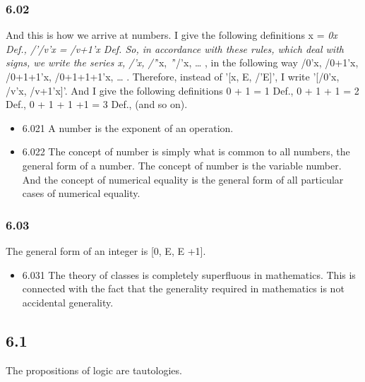 \documentclass[11pt]{article}
\begin{document}
\subsubsection*{6.02}
\label{sec:org99169f6}
And this is how we arrive at numbers. I give the following definitions
x = \emph{0x Def., /'/v'x = /v+1'x Def. So, in accordance with these rules,
which deal with signs, we write the series x, /'x, /'}'x, \emph{'}'/'x, \ldots{} , in
the following way /0'x, /0+1'x, /0+1+1'x, /0+1+1+1'x, \ldots{} . Therefore,
instead of '[x, E, /'E]', I write '[/0'x, /v'x, /v+1'x]'. And I give the
following definitions 0 + 1 = 1 Def., 0 + 1 + 1 = 2 Def., 0 + 1 + 1 +1 = 3
Def., (and so on).
\begin{itemize}
\item 6.021
\label{sec:org1e5a35c}
A number is the exponent of an operation.
\item 6.022
\label{sec:org5200b9b}
The concept of number is simply what is common to all numbers, the
general form of a number. The concept of number is the variable number. And
the concept of numerical equality is the general form of all particular
cases of numerical equality.
\end{itemize}
\subsubsection*{6.03}
\label{sec:org64d8422}
The general form of an integer is [0, E, E +1].
\begin{itemize}
\item 6.031
\label{sec:orgc70df47}
The theory of classes is completely superfluous in mathematics. This
is connected with the fact that the generality required in mathematics is
not accidental generality.
\end{itemize}
\subsection*{6.1}
\label{sec:org25253ff}
The propositions of logic are tautologies.
\end{document}
